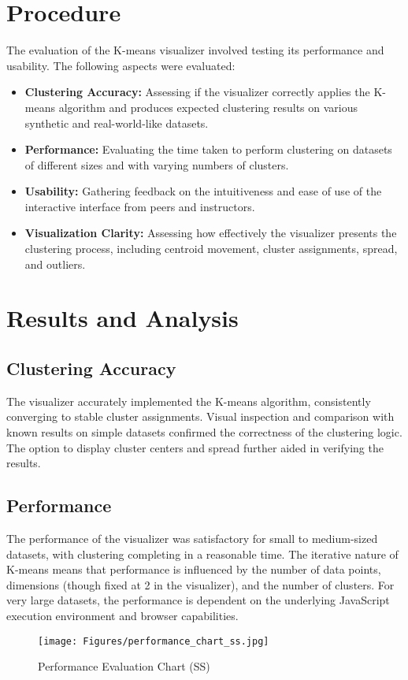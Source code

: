\documentclass[12pt]{report}
\begin{document}
\section{Procedure}
The evaluation of the K-means visualizer involved testing its performance and usability. The following aspects were evaluated:
\begin{itemize}
    \item \textbf{Clustering Accuracy:} Assessing if the visualizer correctly applies the K-means algorithm and produces expected clustering results on various synthetic and real-world-like datasets.
    \item \textbf{Performance:} Evaluating the time taken to perform clustering on datasets of different sizes and with varying numbers of clusters.
    \item \textbf{Usability:} Gathering feedback on the intuitiveness and ease of use of the interactive interface from peers and instructors.
    \item \textbf{Visualization Clarity:} Assessing how effectively the visualizer presents the clustering process, including centroid movement, cluster assignments, spread, and outliers.
\end{itemize}
\section{Results and Analysis}
\subsection{Clustering Accuracy}
The visualizer accurately implemented the K-means algorithm, consistently converging to stable cluster assignments. Visual inspection and comparison with known results on simple datasets confirmed the correctness of the clustering logic. The option to display cluster centers and spread further aided in verifying the results.
\subsection{Performance}
The performance of the visualizer was satisfactory for small to medium-sized datasets, with clustering completing in a reasonable time. The iterative nature of K-means means that performance is influenced by the number of data points, dimensions (though fixed at 2 in the visualizer), and the number of clusters. For very large datasets, the performance is dependent on the underlying JavaScript execution environment and browser capabilities.
\begin{figure}[h]
        \centering
        \texttt{[image: Figures/performance\_chart\_ss.jpg]}
        \caption{Performance Evaluation Chart (SS)}
\end{figure}
\end{document}
